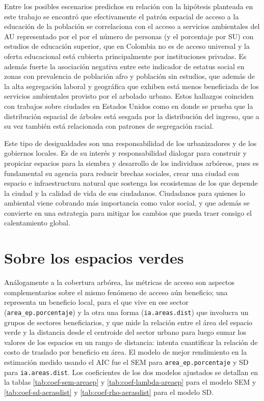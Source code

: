\documentclass[12pt,]{book}
\begin{document}
Entre los posibles escenarios predichos en relación con la hipótesis
planteada en este trabajo se encontró que efectivamente el patrón
espacial de acceso a la educación de la población se correlaciona con el
acceso a servicios ambientales del AU representado por el por el número
de personas (y el porcentaje por SU) con estudios de educación superior,
que en Colombia no es de acceso universal y la oferta educacional está
cubierta principalmente por instituciones privadas. Es además fuerte la
asociación negativa entre este indicador de estatus social en zonas con
prevalencia de población afro y población sin estudios, que además de la
alta segregación laboral y geográfica que exhiben
\citep{arroyo_mina_afrocolombianos_2016, mora_brechas_2014, ceron_indice_2014, PACHECO2013121}
está menos beneficiada de los servicios ambientales provisto por el
arbolado urbano. Estos hallazgos coinciden con trabajos sobre ciudades
en Estados Unidos como en \citep{schwarz_trees_2015} donde se prueba que
la distribución espacial de árboles está sesgada por la distribución del
ingreso, que a su vez también está relacionada con patrones de
segregación racial.

Este tipo de desigualdades son una responsabilidad de los urbanizadores
y de los gobiernos locales. Es de su interés y responsabilidad dialogar
para construir y propiciar espacios para la siembra y desarrollo de los
individuos arbóreos, pues es fundamental su agencia para reducir brechas
sociales, crear una ciudad con espacio e infraestructura natural que
sostenga los ecosistemas de los que depende la ciudad y la calidad de
vida de sus ciudadanos. Ciudadanos para quienes lo ambiental viene
cobrando más importancia como valor social, y que además se convierte en
una estrategia para mitigar los cambios que pueda traer consigo el
calentamiento global.

\section{Sobre los espacios verdes}\label{sobre-los-espacios-verdes}

Análogamente a la cobertura arbórea, las métricas de acceso son aspectos
complementarios sobre el mismo fenómeno de acceso aún beneficio; una
representa un beneficio local, para el que vive en ese sector
(\texttt{area\_ep.porcentaje}) y la otra una forma
(\texttt{ia.areas.dist}) que involucra un grupos de sectores
beneficiarios, y que mide la relación entre el área del espacio verde y
la distancia desde el centroide del sector urbano para luego sumar los
valores de los espacios en un rango de distancia: intenta cuantificar la
relación de costo de traslado por beneficio en área. El modelo de mejor
rendimiento en la estimación medido usando el AIC fue el SEM para
\texttt{area\_ep.porcentaje} y SD para \texttt{ia.areas.dist}. Los
coeficientes de los dos modelos ajustados se detallan en la tablas
\ref{tab:coef-sem-areaep} y \ref{tab:coef-lambda-areaep} para el modelo
SEM y \ref{tab:coef-sd-aerasdist} y \ref{tab:coef-rho-aerasdist} para el
modelo SD.
\end{document}
